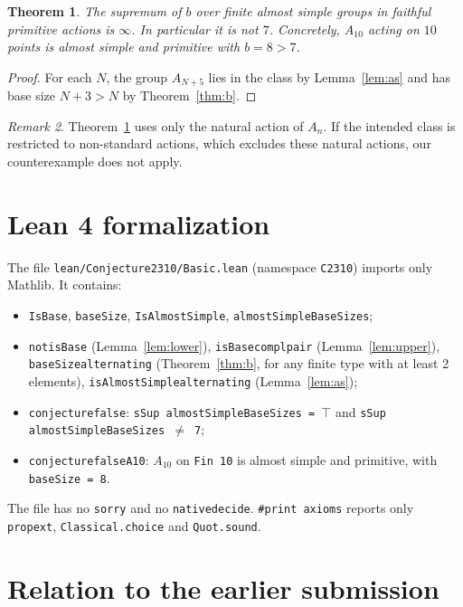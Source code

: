 \documentclass[11pt]{article}
\newtheorem{theorem}{Theorem}
\theoremstyle{definition}
\theoremstyle{remark}
\newtheorem{remark}[theorem]{Remark}
\renewcommand{\_}{\oldus\allowbreak}
\begin{document}
\begin{theorem}\label{thm:main}
The supremum of $b$ over finite almost simple groups in faithful primitive actions is $\infty$.
In particular it is not $7$. Concretely, $A_{10}$ acting on $10$ points is almost simple and
primitive with $b=8>7$.
\end{theorem}
\begin{proof}
For each $N$, the group $A_{N+5}$ lies in the class by Lemma~\ref{lem:as} and has base size
$N+3>N$ by Theorem~\ref{thm:b}.
\end{proof}

\begin{remark}
Theorem~\ref{thm:main} uses only the natural action of $A_n$. If the intended class is restricted
to non-standard actions, which excludes these natural actions, our counterexample does not
apply.
\end{remark}

\section{Lean 4 formalization}

The file \texttt{lean/Conjecture2310/Basic.lean} (namespace \texttt{C2310}) imports only Mathlib. It
contains:
\begin{itemize}
\item \texttt{IsBase}, \texttt{baseSize}, \texttt{IsAlmostSimple}, \texttt{almostSimpleBaseSizes};
\item \texttt{not\_isBase} (Lemma~\ref{lem:lower}), \texttt{isBase\_compl\_pair}
(Lemma~\ref{lem:upper}), \texttt{baseSize\_alternating} (Theorem~\ref{thm:b}, for any finite type
with at least 2 elements), \texttt{isAlmostSimple\_alternating} (Lemma~\ref{lem:as});
\item \texttt{conjecture\_2310\_false}:
\texttt{sSup almostSimpleBaseSizes = \(\top\)} and \texttt{sSup almostSimpleBaseSizes \(\ne\) 7};
\item \texttt{conjecture\_2310\_false\_A10}: $A_{10}$ on \texttt{Fin 10} is almost simple and
primitive, with \texttt{baseSize = 8}.
\end{itemize}
The file has no \texttt{sorry} and no \texttt{native\_decide}. \texttt{\#print axioms} reports only
\texttt{propext}, \texttt{Classical.choice} and \texttt{Quot.sound}.

\section{Relation to the earlier submission}
\end{document}
